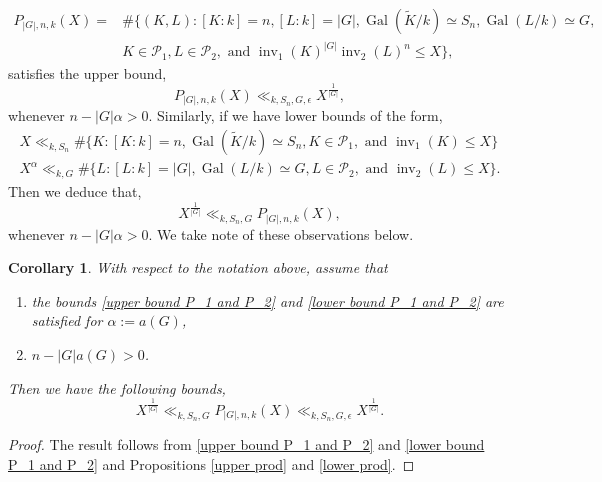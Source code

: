 \documentclass[11pt]{amsart}
\newtheorem{corollary}[theorem]{Corollary}
\newcommand{\op}[1]{\operatorname{#1}}
\numberwithin{equation}{section}
\begin{document}
\begin{equation}
    \begin{split}
       P_{|G|,n, k}(X) =& \#\{(K,L) : [K:k]=n,[L:k]=|G|, \op{Gal}(\widetilde{K}/k) \simeq S_n, \op{Gal}(L/k) \simeq G,\\
        & K\in \mathcal{P}_1, L \in \mathcal{P}_2, \text{ and }\op{inv}_1(K)^{|G|}\op{inv}_2(L)^n \leq X\},
    \end{split}
\end{equation}
satisfies the upper bound,
\[
P_{|G|,n, k}(X) \ll_{k, S_n, G, \epsilon} X^{\frac{1}{|G|}},
\]
whenever $n-|G|\alpha > 0$. Similarly, if we have lower bounds of the form,
\begin{equation}\label{lower bound P_1 and P_2}
    \begin{split}
        X \ll_{k, S_n}\#\{K : [K:k]=n, \op{Gal}(\widetilde{K}/k) \simeq S_n, K\in \mathcal{P}_1, \text{ and }\op{inv}_1(K) \leq X\}\\
       X^{\alpha} \ll_{k,G} \#\{L : [L:k]=|G|, \op{Gal}(L/k) \simeq G, L\in \mathcal{P}_2, \text{ and }\op{inv}_2(L) \leq X\}.
    \end{split}
\end{equation}
Then we deduce that,
\[
 X^{\frac{1}{|G|}} \ll_{k, S_n, G} P_{|G|,n, k}(X),
\]
whenever $n-|G|\alpha > 0$. We take note of these observations below.
\begin{corollary}\label{3.3}
    With respect to the notation above, assume that
    \begin{enumerate}
        \item the bounds \eqref{upper bound P_1 and P_2} and \eqref{lower bound P_1 and P_2} are satisfied for $\alpha:=a(G)$,
        \item $n-|G|a(G)> 0$.
    \end{enumerate} Then we have the following bounds,
    \[
    X^{\frac{1}{|G|}} \ll_{k, S_n, G} P_{|G|,n, k}(X) \ll_{k, S_n, G, \epsilon} X^{\frac{1}{|G|}}.
    \]
\end{corollary}
\begin{proof}
    The result follows from \eqref{upper bound P_1 and P_2} and \eqref{lower bound P_1 and P_2} and Propositions \ref{upper prod} and \ref{lower prod}.
\end{proof}
\end{document}
